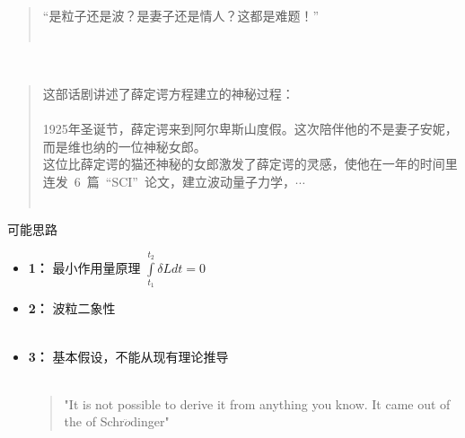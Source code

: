 \begin{frame}
    \begin{alertblock} {}  
    \begin{quote}
        “是粒子还是波？是妻子还是情人？这都是难题！” \\
        ~~\\
    \end{quote} 
    ~~\\ 
    \begin{quote}    
    这部话剧讲述了薛定谔方程建立的神秘过程：\\
    ~~\\
    1925年圣诞节，薛定谔来到阿尔卑斯山度假。这次陪伴他的不是妻子安妮，而是维也纳的一位神秘女郎。\\
    这位比薛定谔的猫还神秘的女郎激发了薛定谔的灵感，使他在一年的时间里连发~6~篇~“SCI”~论文，建立波动量子力学，$\cdots$\\
    ~~\\
    \end{quote} 
    \end{alertblock}   
\end{frame}

\begin{frame}
	\begin{alertblock} {可能思路}  
		\begin{itemize}
			 \item 	\textbf{1：}  最小作用量原理 $\int\limits_{t_1}^{t_2} \delta L d t =0 $\\ 
			 \item 	\textbf{2：}  波粒二象性\\ 
			~\\ 
			 \item 	\textbf{3：}  基本假设，不能从现有理论推导\\
            ~\\ 
            \begin{quote}
            "It is not possible to derive it from anything you know. It came out of the \alert{\faHeartbeat} of Schr$\ddot{o}$dinger"\\
            \end{quote}
		\end{itemize}
	\end{alertblock}
\end{frame}

